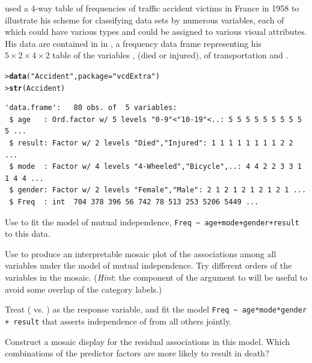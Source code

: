 \documentclass[10pt,krantz2]{krantz}\usepackage[]{graphicx}\usepackage[]{color}
\makeatletter
\newcommand{\hlstr}[1]{\textcolor[rgb]{0.192,0.494,0.8}{#1}}%
\newcommand{\hlstd}[1]{\textcolor[rgb]{0.345,0.345,0.345}{#1}}%
\newcommand{\hlkwc}[1]{\textcolor[rgb]{0.333,0.667,0.333}{#1}}%
\newcommand{\hlkwd}[1]{\textcolor[rgb]{0.737,0.353,0.396}{\textbf{#1}}}%
\newenvironment{kframe}{%
 \def\at@end@of@kframe{}%
 \ifinner\ifhmode%
  \def\at@end@of@kframe{\end{minipage}}%
  \begin{minipage}{\columnwidth}%
 \fi\fi%
 \def\FrameCommand##1{\hskip\@totalleftmargin \hskip-\fboxsep
 \colorbox{shadecolor}{##1}\hskip-\fboxsep
     \hskip-\linewidth \hskip-\@totalleftmargin \hskip\columnwidth}%
 \MakeFramed {\advance\hsize-\width
   \@totalleftmargin\z@ \linewidth\hsize
   \@setminipage}}%
 {\par\unskip\endMakeFramed%
 \at@end@of@kframe}
\newenvironment{knitrout}{}{} %
\renewenvironment{knitrout}{\small\renewcommand{\baselinestretch}{.85}}{} %
\makeatother
\begin{document}
\begin{Exercises}
  \exercise\label{lab:mosaic-accident} \citet[p. 30--31]{Bertin:83} used a 4-way table of frequencies of traffic accident victims in France in 1958
  to illustrate his scheme for classifying data sets by numerous variables, each of which could have various types
  and could be assigned to various visual attributes. His data are contained in  in ,
  a frequency data frame representing his $5 \times 2 \times 4 \times 2$ table of the variables
  ,  (died or injured),  of transportation and .
\begin{knitrout}
\color{fgcolor}\begin{kframe}
\begin{alltt}
\hlstd{> }\hlkwd{data}\hlstd{(}\hlstr{"Accident"}\hlstd{,} \hlkwc{package}\hlstd{=}\hlstr{"vcdExtra"}\hlstd{)}
\hlstd{> }\hlkwd{str}\hlstd{(Accident)}
\end{alltt}
\begin{verbatim}
'data.frame':	80 obs. of  5 variables:
 $ age   : Ord.factor w/ 5 levels "0-9"<"10-19"<..: 5 5 5 5 5 5 5 5 5 5 ...
 $ result: Factor w/ 2 levels "Died","Injured": 1 1 1 1 1 1 1 1 2 2 ...
 $ mode  : Factor w/ 4 levels "4-Wheeled","Bicycle",..: 4 4 2 2 3 3 1 1 4 4 ...
 $ gender: Factor w/ 2 levels "Female","Male": 2 1 2 1 2 1 2 1 2 1 ...
 $ Freq  : int  704 378 396 56 742 78 513 253 5206 5449 ...
\end{verbatim}
\end{kframe}
\end{knitrout}
    \begin{enumerate*}
      \item Use  to fit the model of mutual independence, \verb|Freq ~ age+mode+gender+result| to
      this data.
      \item Use  to produce an interpretable mosaic plot of the associations among all variables under the
      model of mutual independence.  Try different orders of the variables in the mosaic.  (\emph{Hint}: the 
       component of the 
       argument to  will be useful to avoid some overlap of the category labels.)
      \item Treat  ( vs. ) as the response variable, and fit the model \newline
      \verb|Freq ~ age*mode*gender + result| that asserts independence of  from all others jointly.
      \item Construct a mosaic display for the residual associations in this model.  Which combinations of the
      predictor factors are more likely to result in death?
    \end{enumerate*}


\end{Exercises}
\end{document}
